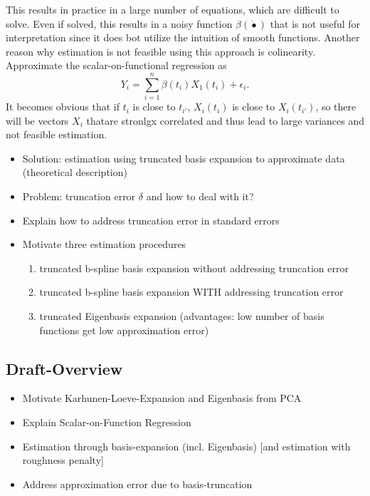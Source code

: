\documentclass[11pt,twoside,a4paper]{article}
\begin{document}
  This results in practice in a large number of equations, which are difficult to solve. Even if solved, this results in a noisy function $\beta(\dot{•})$ that is not useful for interpretation since it does bot utilize the intuition of smooth functions. Another reason why estimation is not feasible using this approach is colinearity. Approximate the scalar-on-functional regression as
  	\begin{equation}
     Y_i = \sum_{i = 1}^{n} \beta(t_{i})X_1(t_{i}) + \epsilon_{i}.
    \end{equation}It becomes obvious that if $t_{i}$ is close to $t_{i'}$, $X_{i}(t_{i})$ is close to $X_{i}(t_{i'})$, so there will be vectors $X_{i}$ thatare stronlgx correlated and thus lead to large variances and not feasible estimation.
   
    
	
	\begin{itemize}
		\item Solution: estimation using truncated basis expansion to approximate data (theoretical description)
		\item Problem: truncation error $\delta$ and how to deal with it?
		\item Explain how to address truncation error in standard errors
		\item Motivate three estimation procedures
		\begin{enumerate}
			\item truncated b-spline basis expansion without addressing truncation error
			\item truncated b-spline basis expansion WITH addressing truncation error
			\item truncated Eigenbasis expansion (advantages: low number of basis functions get low approximation error)
		\end{enumerate}
	\end{itemize}
	
	\subsection{Draft-Overview}
	\begin{itemize}
		\item Motivate Karhunen-Loeve-Expansion and Eigenbasis from PCA		
		\item Explain Scalar-on-Function Regression
		\item Estimation through basis-expansion (incl. Eigenbasis) [and estimation with roughness penalty]
		\item Address approximation error due to basis-truncation
	\end{itemize}
\end{document}
